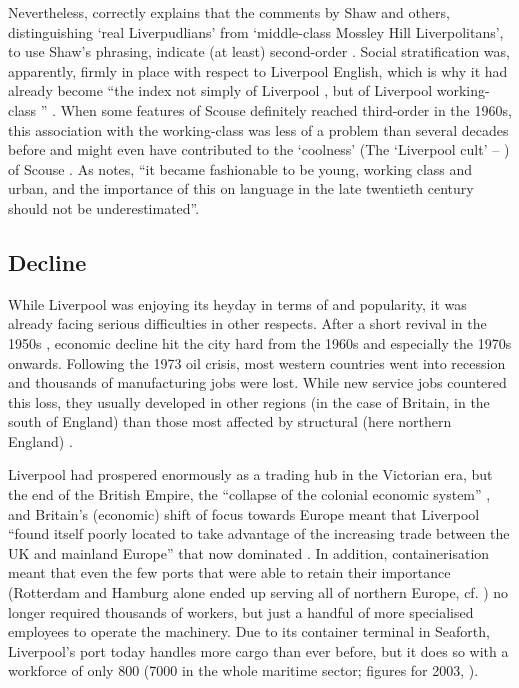 Nevertheless, \citeauthor{crowley2012} correctly explains that the comments by Shaw and others, distinguishing `real Liverpudlians' from `middle-class Mossley Hill Liverpolitans', to use Shaw's phrasing, indicate (at least) second-order . Social stratification was, apparently, firmly in place with respect to Liverpool English, which is why it had already become ``the index not simply of Liverpool , but of Liverpool working-class '' \citep[107]{crowley2012}.
When some features of Scouse definitely reached third-order  in the 1960s, this association with the working-class was less of a problem than several decades before and might even have contributed to the `coolness' (The `Liverpool cult' -- \citealt[109]{crowley2012}) of Scouse .
As \citet[165]{wales2006} notes, ``it became fashionable to be young, working class and urban, and the importance of this on language  in the late twentieth century should not be underestimated''.

		\subsection{Decline}\label{sec.hist.20.decline}

While Liverpool was enjoying its heyday in terms of  and popularity, it was already facing serious difficulties in other respects. After a short revival in the 1950s \citep[cf.][402]{murden2006}, economic decline hit the city hard from the 1960s and especially the 1970s onwards.
Following the 1973 oil crisis, most western countries went into recession and thousands of manufacturing jobs were lost.
While new service jobs countered this loss, they usually developed in other regions (in the case of Britain, in the south of England) than those most affected by structural  (here northern England) \citep[cf.][16--17]{juddparkinson1990a}.

Liverpool had prospered enormously as a trading hub in the Victorian era, but the end of the British Empire, the ``collapse of the colonial economic system'' \citep[52]{belchem2006a}, and Britain's (economic) shift of focus towards Europe meant that Liverpool ``found itself poorly located to take advantage of the increasing trade between the UK and mainland Europe'' that now dominated \citep[166--167]{couch2003a}.
In addition, containerisation meant that even the few ports that were able to retain their importance (Rotterdam and Hamburg alone ended up serving all of northern Europe, cf. \citealt[264]{milne2006}) no longer required thousands of workers, but just a handful of more specialised employees to operate the machinery.
Due to its container terminal in Seaforth, Liverpool's port today handles more cargo than ever before, but it does so with a workforce of only 800 (7000 in the whole maritime sector; figures for 2003, \citealt[cf.][477]{murden2006}).

